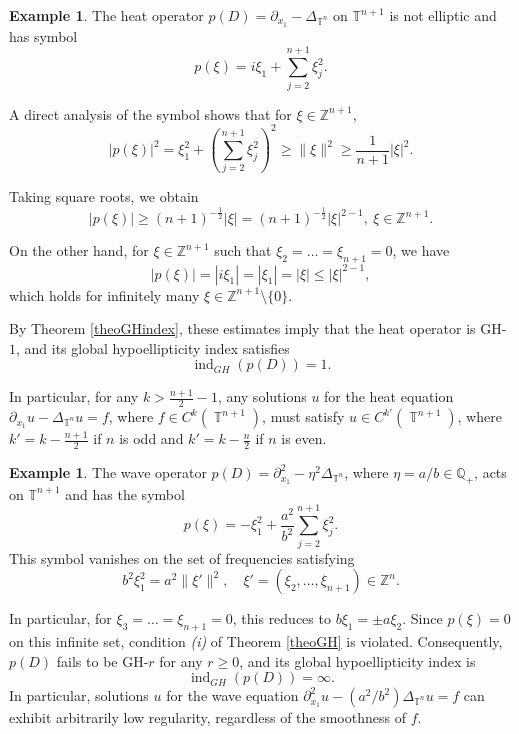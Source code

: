 \documentclass[11pt]{amsart}
\numberwithin{equation}{section}
\theoremstyle{definition}
\newtheorem{example}[theorem]{Example}
\DeclareMathOperator{\T}{\mathbb{T}}
\begin{document}
	
	\begin{example}\label{Heat_GH-1}
		The heat operator \( p(D) = \partial_{x_1} - \Delta_{\mathbb{T}^n} \) on \( \mathbb{T}^{n+1} \) is not elliptic and has symbol
		\[
		p(\xi) = i\xi_1 + \sum_{j=2}^{n+1} \xi_j^2.
		\]
		
		A direct analysis of the symbol shows that for \( \xi \in \mathbb{Z}^{n+1} \),
		\[
		|p(\xi)|^2 = \xi_1^2 + \left( \sum_{j=2}^{n+1} \xi_j^2 \right)^2 \geq \|\xi\|^2 \geq \frac{1}{n+1} |\xi|^2.
		\]
		
		Taking square roots, we obtain
		\[
		|p(\xi)| \geq (n+1)^{-\frac{1}{2}} |\xi| = (n+1)^{-\frac{1}{2}} |\xi|^{2 - 1}, \ \xi \in \mathbb{Z}^{n+1}.
		\]
		
		On the other hand, for \( \xi \in \mathbb{Z}^{n+1} \) such that \( \xi_2 = \dots = \xi_{n+1} = 0 \), we have
		\[
		|p(\xi)| = |i\xi_1| = |\xi_1| = |\xi| \leq |\xi|^{2 - 1},
		\]
		which holds for infinitely many \( \xi \in \mathbb{Z}^{n+1} \setminus \{0\} \).
		
		By Theorem \ref{theoGHindex}, these estimates imply that the heat operator is GH-\( 1 \), and its global hypoellipticity index satisfies
		\[
		\operatorname{ind}_{GH}(p(D)) = 1.
		\]

	 In particular, for any $k>\frac{n+1}{2}-1$, any solutions $u$ for the heat equation $\partial_{x_1}u-\Delta_{\T^n}u=f$, where $f\in C^{k}(\T^{n+1})$, must satisfy $u\in C^{k'}(\T^{n+1})$, where $k'=k-\frac{n+1}{2}$ if $n$ is odd and $k'=k-\frac{n}{2}$ if $n$ is even.
	\end{example}

	\begin{example}\label{Wave_GH-infty}
		The wave operator \( p(D) = \partial_{x_1}^2 - \eta^2 \Delta_{\mathbb{T}^n} \), where \( \eta=a/b\in\mathbb{Q}_+ \), acts on \( \mathbb{T}^{n+1} \) and has the symbol
		\[
		p(\xi) = -\xi_1^2 + \frac{a^2}{b^2} \sum_{j=2}^{n+1} \xi_j^2.
		\]	
		This symbol vanishes on the set of frequencies satisfying
		\[
		b^2\xi_1^2 = {a^2} \|\xi'\|^2, \quad \xi' = (\xi_2, \dots, \xi_{n+1}) \in \mathbb{Z}^n.
		\]
		
		In particular, for \( \xi_3 = \dots = \xi_{n+1} = 0 \), this reduces to \( b\xi_1 = \pm a  \xi_2 \).		
		Since \( p(\xi) = 0 \) on this infinite set, condition {\it (i)} of Theorem \ref{theoGH} is violated. Consequently, \( p(D) \) fails to be GH-\( r \) for any \( r \geq 0 \), and its global hypoellipticity index is
		\[
		\operatorname{ind}_{GH}(p(D)) = \infty.
		\]
         In particular, solutions $u$ for the wave equation $\partial_{x_1}^2u-(a^2/b^2)\Delta_{\T^n}u=f$ can exhibit arbitrarily low regularity, regardless of the smoothness of $f$. 
	\end{example}
\end{document}
